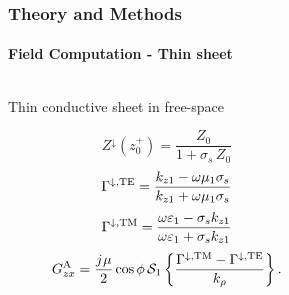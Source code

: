 \documentclass[mathserif,16pt,xcolor=table]{beamer}
\begin{document}
      \begin{frame}
        \frametitle{Theory and Methods}
        \framesubtitle{Field Computation - Thin sheet}
        \begin{columns}[T] %
          \begin{column}{.65\textwidth}
            \begin{outline}[itemize]
                \1 Thin conductive sheet in free-space
              \end{outline}
              \begin{equation} \nonumber
                Z^{\downarrow}(z_0^+) = \frac{Z_0}{ 1 + \sigma_s \, Z_0}
              \end{equation}
              \begin{equation} \nonumber
                \Gamma^{\downarrow, \mathrm{TE}} = \frac{k_{z1} - \omega \mu_1 \sigma_s }{k_{z1} + \omega \mu_1 \sigma_s}
              \end{equation}
              \begin{equation} \nonumber
                \Gamma^{\downarrow, \mathrm{TM}} = \frac{ \omega \varepsilon_1 -\sigma_s k_{z1} }{\omega \varepsilon_1 + \sigma_s k_{z1}}
              \end{equation}
              \begin{equation} \nonumber
                G_{zx}^\mathrm{A} = \frac{{j}\mkern1mu \mu}{2} \cos \phi \, \mathcal{S}_1 \left \{ \frac{\Gamma^{\downarrow, \mathrm{TM}} - \Gamma^{\downarrow, \mathrm{TE}}}{ k_{\rho}} \right \}.
                \label{eq:somm_Gzx}
              \end{equation}
          \end{column}
          \begin{column}[T]{.5\textwidth}
            \begin{figure}
              \centering \vspace*{-1.5cm} \hspace*{-1cm}
              \fontsize{6}{7}\selectfont
              \def\svgwidth{.5\linewidth}
              
            \end{figure}
          \end{column}
        \end{columns}
      \end{frame}
\end{document}
